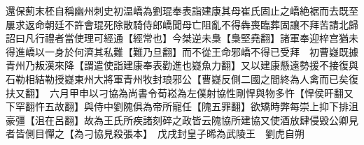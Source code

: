 還保薊末柸自稱幽州刺史初温嶠為劉琨奉表詣建康其母崔氏固止之嶠絶裾而去既至屢求返命朝廷不許會琨死除散騎侍郎嶠聞母亡阻亂不得犇喪臨葬固讓不拜苦請北歸詔曰凡行禮者當使理可經通【經常也】今桀逆未梟【梟堅堯翻】諸軍奉迎梓宫猶未得進嶠以一身於何濟其私難【難乃旦翻】而不從王命邪嶠不得已受拜　初曹嶷既據青州乃叛漢來降【謂遣使詣建康奉表勸進也嶷魚力翻】又以建康懸遠勢援不接復與石勒相結勒授嶷東州大將軍青州牧封琅邪公【曹嶷反側二國之間終為人禽而已矣復扶又翻】　六月甲申以刁協為尚書令荀崧為左僕射協性剛悍與物多忤【悍侯旰翻又下罕翻忤五故翻】與侍中劉隗俱為帝所寵任【隗五罪翻】欲矯時弊每崇上抑下排沮豪彊【沮在呂翻】故為王氏所疾諸刻碎之政皆云隗協所建協又使酒放肆侵毁公卿見者皆側目憚之【為刁協見殺張本】　戊戌封皇子晞為武陵王　劉虎自朔